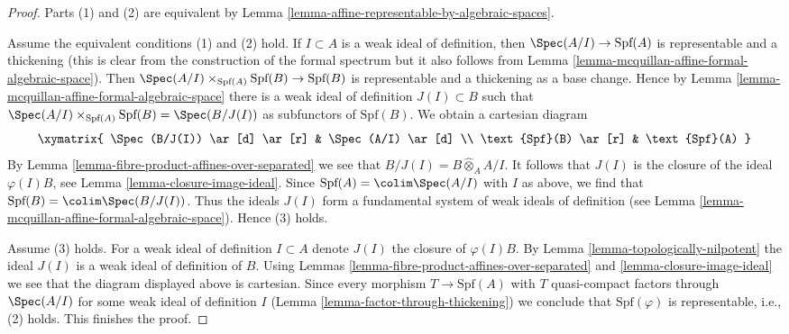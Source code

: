 \begin{proof}
Parts (1) and (2) are equivalent by
Lemma \ref{lemma-affine-representable-by-algebraic-spaces}.

\medskip\noindent
Assume the equivalent conditions (1) and (2) hold.
If $I \subset A$ is a weak ideal of definition, then
$\Spec(A/I) \to \text{Spf}(A)$ is representable and a thickening
(this is clear from the construction of the formal spectrum
but it also follows from
Lemma \ref{lemma-mcquillan-affine-formal-algebraic-space}).
Then $\Spec(A/I) \times_{\text{Spf}(A)} \text{Spf}(B) \to \text{Spf}(B)$
is representable and a thickening as a base change.
Hence by
Lemma \ref{lemma-mcquillan-affine-formal-algebraic-space}
there is a weak ideal of definition $J(I) \subset B$ such that
$\Spec(A/I) \times_{\text{Spf}(A)} \text{Spf}(B) = \Spec(B/J(I))$
as subfunctors of $\text{Spf}(B)$. We obtain a cartesian diagram
$$
\xymatrix{
\Spec(B/J(I)) \ar[d] \ar[r] & \Spec(A/I) \ar[d] \\
\text{Spf}(B) \ar[r] & \text{Spf}(A)
}
$$
By Lemma \ref{lemma-fibre-product-affines-over-separated}
we see that $B/J(I) = B \widehat{\otimes}_A A/I$.
It follows that $J(I)$ is the closure of the ideal $\varphi(I)B$, see
Lemma \ref{lemma-closure-image-ideal}.
Since $\text{Spf}(A) = \colim \Spec(A/I)$ with $I$ as above,
we find that $\text{Spf}(B) = \colim \Spec(B/J(I))$.
Thus the ideals $J(I)$ form a fundamental system of weak
ideals of definition (see
Lemma \ref{lemma-mcquillan-affine-formal-algebraic-space}).
Hence (3) holds.

\medskip\noindent
Assume (3) holds. For a weak ideal of definition $I \subset A$ denote
$J(I)$ the closure of $\varphi(I)B$. By
Lemma \ref{lemma-topologically-nilpotent}
the ideal $J(I)$ is a weak ideal of definition of $B$. Using
Lemmas \ref{lemma-fibre-product-affines-over-separated} and
\ref{lemma-closure-image-ideal}
we see that the diagram displayed above is cartesian. Since
every morphism $T \to \text{Spf}(A)$ with $T$ quasi-compact
factors through $\Spec(A/I)$ for some weak ideal of definition $I$
(Lemma \ref{lemma-factor-through-thickening})
we conclude that $\text{Spf}(\varphi)$ is representable, i.e.,
(2) holds. This finishes the proof.
\end{proof}

